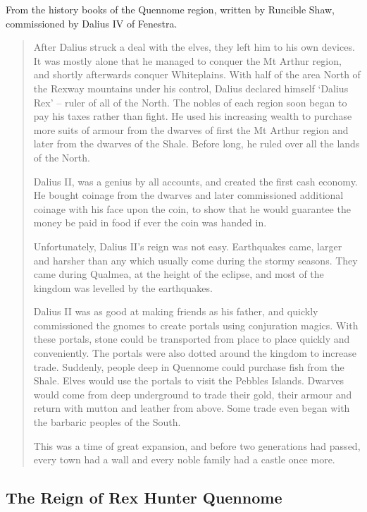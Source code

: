 \begin{multicols}{2}
From the history books of the Quennome region, written by Runcible Shaw, commissioned by Dalius IV of Fenestra.

\begin{quotation}

  After Dalius struck a deal with the elves, they left him to his own devices.
  It was mostly alone that he managed to conquer the Mt Arthur region, and shortly afterwards conquer Whiteplains.
  With half of the area North of the Rexway mountains under his control, Dalius declared himself `Dalius Rex' -- ruler of all of the North.
  The nobles of each region soon began to pay his taxes rather than fight.
  He used his increasing wealth to purchase more suits of armour from the dwarves of first the Mt Arthur region and later from the dwarves of the Shale.
  Before long, he ruled over all the lands of the North.

  Dalius II, was a genius by all accounts, and created the first cash economy.
  He bought coinage from the dwarves and later commissioned additional coinage with his face upon the coin, to show that he would guarantee the money be paid in food if ever the coin was handed in.

  Unfortunately, Dalius II's reign was not easy.
  Earthquakes came, larger and harsher than any which usually come during the stormy seasons.
  They came during Qualmea, at the height of the eclipse, and most of the kingdom was levelled by the earthquakes.

  Dalius II was as good at making friends as his father, and quickly commissioned the gnomes to create portals using conjuration magics.
  With these portals, stone could be transported from place to place quickly and conveniently.
  The portals were also dotted around the kingdom to increase trade.
  Suddenly, people deep in Quennome could purchase fish from the Shale.
  Elves would use the portals to visit the Pebbles Islands.
  Dwarves would come from deep underground to trade their gold, their armour and return with mutton and leather from above.
  Some trade even began with the barbaric peoples of the South.

  This was a time of great expansion, and before two generations had passed, every town had a wall and every noble family had a castle once more.

\end{quotation}

\subsection{The Reign of Rex Hunter Quennome}


\end{multicols}
